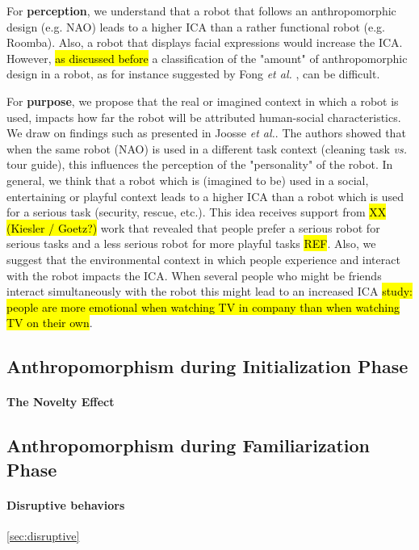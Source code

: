 \documentclass[lettersize, apacite, twoside, HRI]{apa_HRI}
\begin{document}
	For \textbf{perception}, we understand that a robot that follows an anthropomorphic design (e.g. NAO) leads to a higher ICA than a rather functional robot (e.g. Roomba). Also, a robot that displays facial expressions would increase the ICA. However, \hl{as discussed before} a classification of the "amount" of anthropomorphic design in a robot, as for instance suggested by Fong \textit{et al.} \cite{fong_survey_2003}, can be difficult.
	
	For \textbf{purpose}, we propose that the real or imagined context in which a robot is used, impacts how far the robot will be attributed human-social characteristics. We	draw on findings such as presented in Joosse \textit{et al.}. The authors showed that when the same robot (NAO) is used in a different task context (cleaning task \textit{vs.} tour guide), this influences the perception of the "personality" of the robot. In general, we think that a robot which is (imagined to be) used in a social, entertaining or playful context leads to a higher ICA than a robot which is used for a serious task (security, rescue, etc.). This idea receives support from \hl{XX (Kiesler / Goetz?)} work that revealed that people prefer a serious robot for serious tasks and a less serious robot for more playful tasks \hl{REF}. Also, we suggest that the environmental context in which people experience and interact with the robot impacts the ICA. When several people who might be friends interact simultaneously with the robot this might lead to an increased ICA \hl{study: people are more emotional when watching TV in company than when watching TV on their own}.

\subsection{Anthropomorphism during Initialization Phase}
\label{sec:initialization}

\paragraph{The Novelty Effect}
\label{sec:noveltyeffect}

\subsection{Anthropomorphism during Familiarization Phase}
\label{sec:familiarization}

\paragraph{Disruptive behaviors}
\ref{sec:disruptive}
\end{document}
